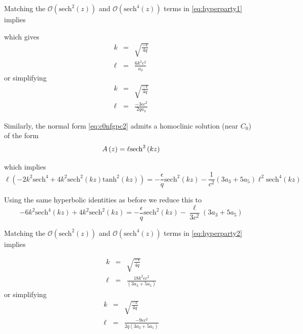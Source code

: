 Matching the $\mathcal{O}\left(\mathrm{sech}^2\left(z\right)\right)$  and   $\mathcal{O}\left(\mathrm{sech}^4\left(z\right)\right)$ terms in \eqref{eq:hyperparty1} implies


which gives
\begin{subequations} 
\begin{eqnarray}
k &=& \sqrt{\frac{-\epsilon}{4q}}  \\
\ell &=& \frac{ 6 k^2 c^2 }{ a_3 } 
\end{eqnarray}
\end{subequations}
or simplifying
\begin{subequations} 
\begin{eqnarray}
k &=& \sqrt{\frac{-\epsilon}{4q}}  \\
\ell &=& \frac{ - 3 \epsilon c^2 }{2 q a_3 } 
\end{eqnarray}
\end{subequations}

Similarly, the normal form \eqref{eq:c0nfgpc2} admits a homoclinic solution (near $C_0$) of the form 
\begin{equation}\label{eq:solitongpc2}
A\left(z\right) = \ell \space \mathrm{sech}^2\left(k z\right)
\end{equation}

which implies
\begin{equation}\label{eq:hyperparty1}
\ell \left( -2 k^2 \mathrm{sech}^4 + 4 k^2 \mathrm{sech}^2\left(kz\right) \mathrm{tanh}^2\left(kz\right) \right) = - \frac{\epsilon}{q} \mathrm{sech}^2(kz) - \frac{1}{c^2}\left(3a_3 + 5a_5\right) \ell^2 \mathrm{sech}^4(kz) 
\end{equation}

Using the same hyperbolic identities as before we reduce this to
\begin{equation}\label{eq:hyperparty2}
-6 k^2 \mathrm{sech}^4\left(k z\right) + 4 k^2 \mathrm{sech}^2\left(k z\right)=
-\frac{\epsilon}{q} \mathrm{sech}^2\left(k z\right) - \frac{\ell}{3c^2}\left(3a_3 + 5a_5\right) 
\end{equation}

Matching the $\mathcal{O}\left(\mathrm{sech}^2\left(z\right)\right)$  and   $\mathcal{O}\left(\mathrm{sech}^4\left(z\right)\right)$ terms in \eqref{eq:hyperparty2} implies

\begin{subequations} 
\begin{eqnarray}
k &=& \sqrt{\frac{-\epsilon}{4q}} \label{eq:keq} \\
\ell &=& \frac{ 18 k^2 \epsilon c^2 }{ \left(3 a_3 + 5 a_5\right) } 
\end{eqnarray}
\end{subequations}
or simplifying
\begin{subequations} 
\begin{eqnarray}
k &=& \sqrt{\frac{-\epsilon}{4q}} \label{eq:keq} \\
\ell &=& \frac{ - 9 \epsilon c^2 }{2 q \left(3 a_3 + 5 a_5\right) } 
\end{eqnarray}
\end{subequations}

